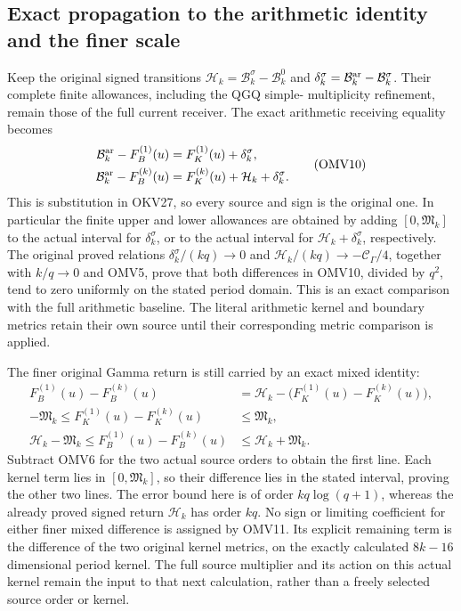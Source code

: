 \documentclass[11pt,a4paper]{article}
\begin{document}
\subsection{Exact propagation to the arithmetic identity and the finer scale}
Keep the original signed transitions
$\mathcal H_k=\mathcal B_k^\sigma-\mathcal B_k^0$ and
$\delta_k^\sigma=\mathcal B_k^{\rm ar}-\mathcal B_k^\sigma$.
Their complete finite allowances, including the QGQ simple-
multiplicity refinement, remain those of the full current receiver.
The exact arithmetic receiving equality becomes
\[
 \begin{aligned}
 \mathcal B_k^{\rm ar}-F_B^{(1)}(u)
       &=F_K^{(1)}(u)+\delta_k^\sigma,\\
 \mathcal B_k^{\rm ar}-F_B^{(k)}(u)
       &=F_K^{(k)}(u)+\mathcal H_k+\delta_k^\sigma.
 \end{aligned}\tag{OMV10}
\]
This is substitution in OKV27, so every source and sign is the
original one. In particular the finite upper and lower allowances
are obtained by adding $[0,\mathfrak M_k]$ to the actual interval
for $\delta_k^\sigma$, or to the actual interval for
$\mathcal H_k+\delta_k^\sigma$, respectively. The original proved
relations $\delta_k^\sigma/(kq)\to0$ and
$\mathcal H_k/(kq)\to-\mathcal C_\Gamma/4$, together with
$k/q\to0$ and OMV5, prove that both differences in OMV10,
divided by $q^2$, tend to zero uniformly on the stated period domain.
This is an exact comparison with the full arithmetic baseline.
The literal arithmetic kernel and boundary metrics retain their
own source until their corresponding metric comparison is applied.

The finer original Gamma return is still carried by an exact mixed
identity:
\[
 \begin{aligned}
 F_B^{(1)}(u)-F_B^{(k)}(u)
       &=\mathcal H_k-
                   \bigl(F_K^{(1)}(u)-F_K^{(k)}(u)\bigr),\\
 -\mathfrak M_k\leq F_K^{(1)}(u)-F_K^{(k)}(u)
       &\leq\mathfrak M_k,\\
 \mathcal H_k-\mathfrak M_k
       \leq F_B^{(1)}(u)-F_B^{(k)}(u)
       &\leq\mathcal H_k+\mathfrak M_k.
 \end{aligned}\tag{OMV11}
\]
Subtract OMV6 for the two actual source orders to obtain the first
line. Each kernel term lies in $[0,\mathfrak M_k]$, so their
difference lies in the stated interval, proving the other two lines.
The error bound here is of order $kq\log(q+1)$, whereas the
already proved signed return $\mathcal H_k$ has order $kq$.
No sign or limiting coefficient for either finer mixed difference
is assigned by OMV11. Its explicit remaining term is the difference
of the two original kernel metrics, on the exactly calculated
$8k-16$ dimensional period kernel. The full source multiplier and
its action on this actual kernel remain the input to that next
calculation, rather than a freely selected source order or kernel.
\end{document}
